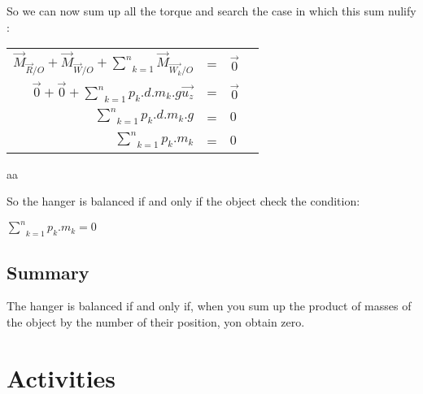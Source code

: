 \documentclass{report}
\begin{document}
So we can now sum up all the torque and search the case in which this sum nulify :
\begin{tabular}{rcll}
$\overrightarrow{M}_{\overrightarrow{R}/O} + \overrightarrow{M}_{\overrightarrow{W}/O} + \underset{k = 1}{\overset{n}{\sum}} \overrightarrow{M}_{\overrightarrow{W_k}/O}$ & = & $\overrightarrow{0}$ & \\
$\overrightarrow{0} + \overrightarrow{0} + \underset{k = 1}{\overset{n}{\sum}} p_k . d . m_k . g \overrightarrow{u_z}$ & = & $\overrightarrow{0}$ & \\
$\underset{k = 1}{\overset{n}{\sum}} p_k . d . m_k . g $ & = & $0$ & \\
$\underset{k = 1}{\overset{n}{\sum}} p_k . m_k $ & = & $0$ & \\
\end{tabular}aa

So the hanger is balanced if and only if the object check the condition: 
\begin{center}
$\underset{k = 1}{\overset{n}{\sum}} p_k . m_k = 0$
\end{center}


\section{Summary}

The hanger is balanced if and only if, when you sum up the product of masses of the object by the number of their position, yon obtain zero.




\chapter{Activities}
\end{document}
